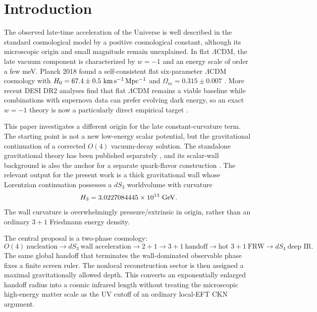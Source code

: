 \documentclass[11pt]{article}
\begin{document}
\section{Introduction}

The observed late-time acceleration of the Universe is well described in the standard cosmological model by a positive cosmological constant, although its microscopic origin and small magnitude remain unexplained.  In flat $\Lambda$CDM, the late vacuum component is characterized by $w=-1$ and an energy scale of order a few meV.  Planck 2018 found a self-consistent flat six-parameter $\Lambda$CDM cosmology with $H_0=67.4\pm0.5~{\rm km\,s^{-1}\,Mpc^{-1}}$ and $\Omega_m=0.315\pm0.007$ \cite{Planck2018}.  More recent DESI DR2 analyses find that flat $\Lambda$CDM remains a viable baseline while combinations with supernova data can prefer evolving dark energy, so an exact $w=-1$ theory is now a particularly direct empirical target \cite{DESIDR2,Lodha2025}.

This paper investigates a different origin for the late constant-curvature term.  The starting point is not a new low-energy scalar potential, but the gravitational continuation of a corrected $O(4)$ vacuum-decay solution.  The standalone gravitational theory has been published separately \cite{HoffmannGCDL}, and its scalar-wall background is also the anchor for a separate quark-flavor construction \cite{HoffmannFlavor}.  The relevant output for the present work is a thick gravitational wall whose Lorentzian continuation possesses a $dS_3$ worldvolume with curvature
\begin{equation}
H_3=3.0227084445\times10^{13}\ {\rm GeV}.
\label{eq:H3}
\end{equation}
The wall curvature is overwhelmingly pressure/extrinsic in origin, rather than an ordinary $3+1$ Friedmann energy density.

The central proposal is a two-phase cosmology:
\begin{equation}
O(4)\ \text{nucleation}
\longrightarrow dS_3\ \text{wall acceleration}
\longrightarrow 2+1\to3+1\ \text{handoff}
\longrightarrow \text{hot }3+1\ \text{FRW}
\longrightarrow dS_4\ \text{deep IR}.
\label{eq:architecture}
\end{equation}
The same global handoff that terminates the wall-dominated observable phase fixes a finite screen ruler.  The nonlocal reconstruction sector is then assigned a maximal gravitationally allowed depth.  This converts an exponentially enlarged handoff radius into a cosmic infrared length without treating the microscopic high-energy matter scale as the UV cutoff of an ordinary local-EFT CKN argument.
\end{document}
